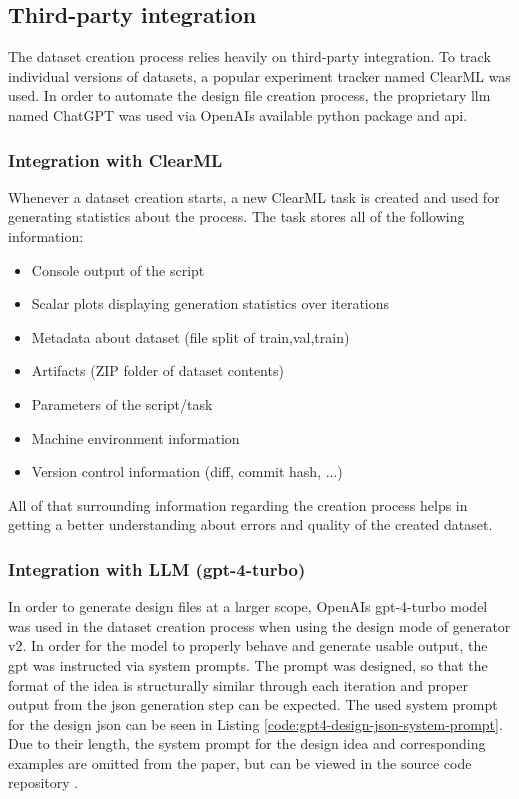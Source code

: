 \documentclass[Bachelor, BIC, english, fhCitStyle, IEEE]{BASE/twbook} %
\newcommand{\nocontentsline}[3]{}
\newcommand{\hidsubsubsection}[1]{\bgroup\let\addcontentsline=\nocontentsline\subsubsection{#1}\egroup}
\begin{document}
\subsection{Third-party integration} %
The dataset creation process relies heavily on third-party integration. To track individual versions of datasets, a popular experiment tracker named ClearML was used. In order to automate the design file creation process, the proprietary \ac{llm} named ChatGPT was used via OpenAIs available python package and \ac{api}.
\hidsubsubsection{Integration with ClearML}
\noindent
Whenever a dataset creation starts, a new ClearML task is created and used for generating statistics about the process. The task stores all of the following information:
\begin{itemize}
    \item Console output of the script
    \item Scalar plots displaying generation statistics over iterations
    \item Metadata about dataset (file split of train,val,train)
    \item Artifacts (ZIP folder of dataset contents)
    \item Parameters of the script/task
    \item Machine environment information
    \item Version control information (diff, commit hash, ...)
\end{itemize}
All of that surrounding information regarding the creation process helps in getting a better understanding about errors and quality of the created dataset.
\hidsubsubsection{Integration with LLM (gpt-4-turbo)}
\noindent
In order to generate design files at a larger scope, OpenAIs gpt-4-turbo model was used in the dataset creation process when using the design mode of generator v2. In order for the model to properly behave and generate usable output, the \ac{gpt} was instructed via system prompts.
The prompt was designed, so that the format of the idea is structurally similar through each iteration and proper output from the \ac{json} generation step can be expected. The used system prompt for the design \ac{json} can be seen in Listing \ref{code:gpt4-design-json-system-prompt}. Due to their length, the system prompt for the design idea and corresponding examples are omitted from the paper, but can be viewed in the source code repository \autocite{UidetectorSrcGenerate}.
\end{document}
